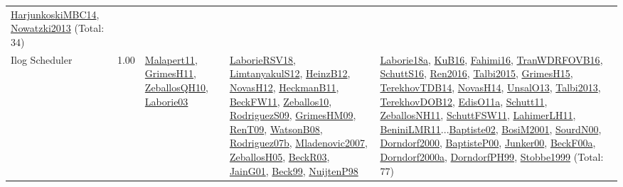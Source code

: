 {\begin{longtable}{p{3cm}r>{\raggedright\arraybackslash}p{6cm}>{\raggedright\arraybackslash}p{6cm}>{\raggedright\arraybackslash}p{8cm}}
\hyperref[detail:HarjunkoskiMBC14]{HarjunkoskiMBC14}, \hyperref[detail:Nowatzki2013]{Nowatzki2013} (Total: 34)\\
\index{Ilog Scheduler}\index{CPSystems!Ilog Scheduler}Ilog Scheduler &  1.00 & \hyperref[detail:Malapert11]{Malapert11}, \hyperref[detail:GrimesH11]{GrimesH11}, \hyperref[detail:ZeballosQH10]{ZeballosQH10}, \hyperref[detail:Laborie03]{Laborie03} & \hyperref[detail:LaborieRSV18]{LaborieRSV18}, \hyperref[detail:LimtanyakulS12]{LimtanyakulS12}, \hyperref[detail:HeinzB12]{HeinzB12}, \hyperref[detail:NovasH12]{NovasH12}, \hyperref[detail:HeckmanB11]{HeckmanB11}, \hyperref[detail:BeckFW11]{BeckFW11}, \hyperref[detail:Zeballos10]{Zeballos10}, \hyperref[detail:RodriguezS09]{RodriguezS09}, \hyperref[detail:GrimesHM09]{GrimesHM09}, \hyperref[detail:RenT09]{RenT09}, \hyperref[detail:WatsonB08]{WatsonB08}, \hyperref[detail:Rodriguez07b]{Rodriguez07b}, \hyperref[detail:Mladenovic2007]{Mladenovic2007}, \hyperref[detail:ZeballosH05]{ZeballosH05}, \hyperref[detail:BeckR03]{BeckR03}, \hyperref[detail:JainG01]{JainG01}, \hyperref[detail:Beck99]{Beck99}, \hyperref[detail:NuijtenP98]{NuijtenP98} & \hyperref[detail:Laborie18a]{Laborie18a}, \hyperref[detail:KuB16]{KuB16}, \hyperref[detail:Fahimi16]{Fahimi16}, \hyperref[detail:TranWDRFOVB16]{TranWDRFOVB16}, \hyperref[detail:SchuttS16]{SchuttS16}, \hyperref[detail:Ren2016]{Ren2016}, \hyperref[detail:Talbi2015]{Talbi2015}, \hyperref[detail:GrimesH15]{GrimesH15}, \hyperref[detail:TerekhovTDB14]{TerekhovTDB14}, \hyperref[detail:NovasH14]{NovasH14}, \hyperref[detail:UnsalO13]{UnsalO13}, \hyperref[detail:Talbi2013]{Talbi2013}, \hyperref[detail:TerekhovDOB12]{TerekhovDOB12}, \hyperref[detail:EdisO11a]{EdisO11a}, \hyperref[detail:Schutt11]{Schutt11}, \hyperref[detail:ZeballosNH11]{ZeballosNH11}, \hyperref[detail:SchuttFSW11]{SchuttFSW11}, \hyperref[detail:LahimerLH11]{LahimerLH11}, \hyperref[detail:BeniniLMR11]{BeniniLMR11}...\hyperref[detail:Baptiste02]{Baptiste02}, \hyperref[detail:BosiM2001]{BosiM2001}, \hyperref[detail:SourdN00]{SourdN00}, \hyperref[detail:Dorndorf2000]{Dorndorf2000}, \hyperref[detail:BaptisteP00]{BaptisteP00}, \hyperref[detail:Junker00]{Junker00}, \hyperref[detail:BeckF00a]{BeckF00a}, \hyperref[detail:Dorndorf2000a]{Dorndorf2000a}, \hyperref[detail:DorndorfPH99]{DorndorfPH99}, \hyperref[detail:Stobbe1999]{Stobbe1999} (Total: 77)\\

\end{longtable}}
